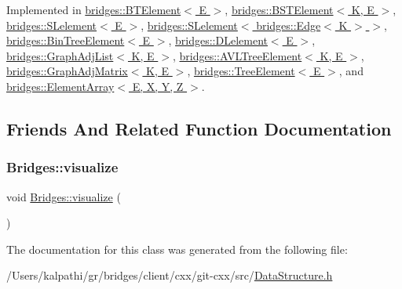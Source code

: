 Implemented in \hyperlink{classbridges_1_1_b_t_element_a43cc18d2c1e71c399782a306b60e4260}{bridges\+::\+B\+T\+Element$<$ E $>$}, \hyperlink{classbridges_1_1_b_s_t_element_af3843873c508c24f90b6e73a6f490bf8}{bridges\+::\+B\+S\+T\+Element$<$ K, E $>$}, \hyperlink{classbridges_1_1_s_lelement_a136330b3481a47b3edb429f323274655}{bridges\+::\+S\+Lelement$<$ E $>$}, \hyperlink{classbridges_1_1_s_lelement_a136330b3481a47b3edb429f323274655}{bridges\+::\+S\+Lelement$<$ bridges\+::\+Edge$<$ K $>$ $>$}, \hyperlink{classbridges_1_1_bin_tree_element_a0a154f68ef0a58715e598a6ef92b9e59}{bridges\+::\+Bin\+Tree\+Element$<$ E $>$}, \hyperlink{classbridges_1_1_d_lelement_a109be7aba8bd3d0450859938b5d3144c}{bridges\+::\+D\+Lelement$<$ E $>$}, \hyperlink{classbridges_1_1_graph_adj_list_af468c62b241894073ab58bed51581b7b}{bridges\+::\+Graph\+Adj\+List$<$ K, E $>$}, \hyperlink{classbridges_1_1_a_v_l_tree_element_a24c005f8e07a7a2682225cead3b7e364}{bridges\+::\+A\+V\+L\+Tree\+Element$<$ K, E $>$}, \hyperlink{classbridges_1_1_graph_adj_matrix_a174dc9df7605c66abe4610943a793c99}{bridges\+::\+Graph\+Adj\+Matrix$<$ K, E $>$}, \hyperlink{classbridges_1_1_tree_element_a6b264d7391442a742edf96bdd5ee5442}{bridges\+::\+Tree\+Element$<$ E $>$}, and \hyperlink{classbridges_1_1_element_array_adfb4e7d78ce01298ca66447e5c5abe6f}{bridges\+::\+Element\+Array$<$ E, X, Y, Z $>$}.



\subsection{Friends And Related Function Documentation}
\hypertarget{classbridges_1_1_data_structure_a0a9e3be9faab475909293766dcda4779}{}\label{classbridges_1_1_data_structure_a0a9e3be9faab475909293766dcda4779} 
\subsubsection{\texorpdfstring{Bridges\+::visualize}{Bridges::visualize}}
{\footnotesize\ttfamily void \hyperlink{namespacebridges_1_1_bridges_a2806e395134614cdd6327400b53d28ad}{Bridges\+::visualize} (\begin{DoxyParamCaption}{ }\end{DoxyParamCaption})\hspace{0.3cm}{\ttfamily [friend]}}



The documentation for this class was generated from the following file\+:\begin{DoxyCompactItemize}
\item 
/\+Users/kalpathi/gr/bridges/client/cxx/git-\/cxx/src/\hyperlink{_data_structure_8h}{Data\+Structure.\+h}\end{DoxyCompactItemize}
